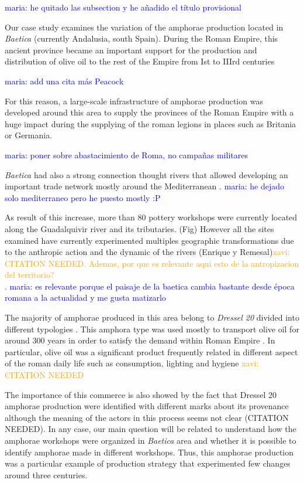 \documentclass[review]{elsarticle}
\newcommand{\memo}[2]{\textcolor{#1}{#2}}
\newcommand{\xavi}[1]{\memo{orange}{xavi: #1\\}}
\newcommand{\maria}[1]{\memo{blue}{maria: #1\\}}
\begin{document}
\maria{he quitado las subsection y he añadido el t\'itulo provisional}

Our case study examines the variation of the amphorae production located in \emph{Baetica} (currently Andalusia, south Spain). During the Roman Empire, this ancient province became an important support for the production and distribution of olive oil to the rest of the Empire from Ist to IIIrd centuries \cite{chic_comercio_2005,millet_anforas_1998, rodriguez_baetican_1998} 

\maria{add una cita m\'as Peacock}


For this reason, a large-scale infrastructure of amphorae production was developed around this area to supply the provinces of the Roman Empire with a huge impact during the supplying of the roman legions in places such as Britania \citep{monfort_britannia_1998} or Germania. 

\maria{poner sobre abastacimiento de Roma, no campañas militares}

\emph{Baetica} had also a strong connection thought rivers that allowed developing an important trade network mostly around the Mediterranean \citep{garcia_vargas_enrique_formal_2010}. 
\maria{ he dejado solo mediterraneo pero he puesto mostly :P}

As result of this increase, more than 80 pottery workshops were currently located along the Guadalquivir river and its tributaries. (Fig)
However all the sites examined have currently experimented multiples geographic transformations due to the anthropic action and the dynamic of the rivers (Enrique y Remesal)\xavi{CITATION NEEDED. Ademas, por que es relevante aqui esto de la antropizacion del territorio?}.
\maria{es relevante porque el paisaje de la baetica cambia bastante desde época romana a la actualidad y me gusta matizarlo} 

The majority of amphorae produced in this area belong to \emph{Dressel 20} divided into different typologies \citep{berni_millet_epigrafianforica_2008, martin-kilcher_romischen_1994}. This amphora type was used mostly to transport olive oil for around 300 years in order to satisfy the demand within Roman Empire \citep{rodriguez_economioleicola_1977}. In particular, olive oil was a significant product frequently related in different aspect of the roman daily life such as consumption, lighting and hygiene %
\xavi{CITATION NEEDED}

The importance of this commerce is also showed by the fact that Dressel 20 amphorae production were identified with different marks about its provenance although the meaning of the actors in this process seems not clear (CITATION NEEDED). In any case, our main question will be related to understand how the amphorae workshops were organized in \textit{Baetica} area and whether it is possible to identify amphorae made in different workshops. 
Thus, this amphorae production was a particular example of production strategy that experimented few changes around three centuries.   
\end{document}

